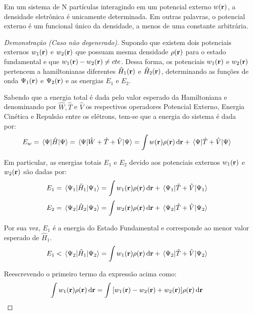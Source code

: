 \begin{teo}
	Em um sistema de N partículas interagindo em um potencial externo $ w(\vb{r}) $, a densidade eletrônica é unicamente determinada. Em outras palavras, o potencial externo é um funcional único da densidade, a menos de uma constante arbitrária. \cite{abc_dft}
\end{teo}

\begin{proof}[Demonstração (Caso não degenerado)]
	Supondo que existem dois potenciais externos $ w_1(\vb{r}) $ e $ w_2(\vb{r}) $ que possuam mesma densidade $ \rho(\vb{r}) $ para o estado fundamental e que $ w_1(\vb{r})-w_2(\vb{r})\neq cte $. Dessa forma, os potenciais $ w_1(\vb{r}) $ e $ w_2(\vb{r}) $ pertencem a hamiltonianas diferentes $ \hat{H}_1(\vb{r}) $ e $ \hat{H}_2(\vb{r}) $, determinando as funções de onda $ \Psi_1(\vb{r}) $ e $ \Psi_2(\vb{r}) $ e as energias $ E_1 $ e $ E_2 $.
	
	Sabendo que a energia total é dada pelo valor esperado da Hamiltoniana e denominando por $ \hat{W},\hat{T}$ e $ \hat{V} $ os respectivos operadores Potencial Externo, Energia Cinética e Repulsão entre os elétrons, tem-se que a energia do sistema é dada por:
	\begin{equation}\label{eq:functional_energy}
		E_w=\ev{\hat{H}}{\Psi}=\ev{\hat{W}+\hat{T}+\hat{V}}{\Psi} = \int w(\vb{r})\dens\dr+\ev{\hat{T}+\hat{V}}{\Psi}
	\end{equation}
	
	Em particular, as energias totais $ E_1 $ e $ E_2 $ devido aos potenciais externos $ w_1(\vb{r}) $ e $ w_2(\vb{r}) $ são dadas por:
	\begin{equation}
		E_1=\ev{\hat{H}_1}{\Psi_1}= \int w_1(\vb{r})\dens\dr+\ev{\hat{T}+\hat{V}}{\Psi_1}
	\end{equation}
	\begin{equation}
		E_2=\ev{\hat{H}_2}{\Psi_2}= \int w_2(\vb{r})\dens\dr+\ev{\hat{T}+\hat{V}}{\Psi_2}
	\end{equation}
	
	Por sua vez, $ E_1 $ é a energia do Estado Fundamental e corresponde ao menor valor esperado de $ \hat{H}_1 $.
	\begin{equation}
		E_1 < \ev{\hat{H}_1}{\Psi_2} = \int w_1(\vb{r})\dens\dr+\ev{\hat{T}+\hat{V}}{\Psi_2}
	\end{equation}
	
	Reescrevendo o primeiro termo da expressão acima como:
	\begin{equation}
		\int w_1(\vb{r})\dens\dr=\int  \bqty{w_1(\vb{r})-w_2(\vb{r})+w_2(\vb{r})}\dens\dr
	\end{equation}
	

\end{proof}
